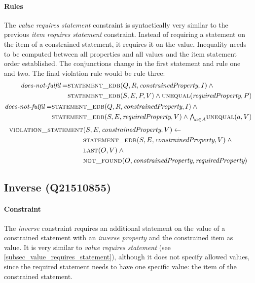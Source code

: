 \documentclass[hyperref,bachelorofscience,fleqn]{cgvpub}
\begin{document}
\paragraph{Rules}
The \emph{value requires statement} constraint is syntactically very similar to the previous \emph{item requires statement} constraint. Instead of requiring a statement on the item of a constrained statement, it requires it on the value. Inequality needs to be computed between all properties and all values and the item statement order established. The conjunctions change in the first statement and rule one and two. The final violation rule would be rule three:
\begin{align}
\begin{split}
\emph{does-not-fulfil} = &\textsc{statement\_edb}(Q, R, \emph{constrainedProperty}, I) \wedge{} \\
&\textsc{statement\_edb}(S, E, P, V) \wedge \textsc{unequal}(\emph{requiredProperty}, P)
\end{split}\\
\begin{split}
\emph{does-not-fulfil} = &\textsc{statement\_edb}(Q, R, \emph{constrainedProperty}, I) \wedge{} \\
&\textsc{statement\_edb}(S, E, \emph{requiredProperty}, V) \wedge {\textstyle\bigwedge}_{a \in A} \textsc{unequal}(a, V)
\end{split}
\end{align}
\begin{align}
\begin{split}
\textsc{violation\_statement}&(S, E, \emph{constrainedProperty}, V) \leftarrow \\
&\textsc{statement\_edb}(S, E, \emph{constrainedProperty}, V) \wedge{} \\
&\textsc{last}(O, V) \wedge{} \\
&\textsc{not\_found}(O, \emph{constrainedProperty}, \emph{requiredProperty})
\end{split}
\end{align}

\subsection{Inverse (Q21510855)}\label{subsec_2_inverse}
\paragraph{Constraint}
The \emph{inverse} constraint requires an additional statement on the value of a constrained statement with an \emph{inverse property} and the constrained item as value. It is very similar to \emph{value requires statement} (see \ref{subsec_value_requires_statement}), although it does not specify allowed values, since the required statement needs to have one specific value: the item of the constrained statement.
\end{document}
